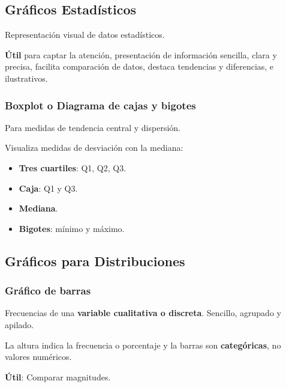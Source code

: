 \hypertarget{gruxe1ficos-estaduxedsticos}{%
\subsection{Gráficos Estadísticos}\label{gruxe1ficos-estaduxedsticos}}

Representación visual de datos estadísticos.

\textbf{Útil} para captar la atención, presentación de información
sencilla, clara y precisa, facilita comparación de datos, destaca
tendencias y diferencias, e ilustrativos.

\hypertarget{boxplot-o-diagrama-de-cajas-y-bigotes}{%
\subsubsection{Boxplot o Diagrama de cajas y
bigotes}\label{boxplot-o-diagrama-de-cajas-y-bigotes}}

Para medidas de tendencia central y dispersión.

Visualiza medidas de desviación con la mediana:

\begin{itemize}
\tightlist
\item
  \textbf{Tres cuartiles}: Q1, Q2, Q3.
\item
  \textbf{Caja}: Q1 y Q3.
\item
  \textbf{Mediana}.
\item
  \textbf{Bigotes}: mínimo y máximo.
\end{itemize}

\hypertarget{gruxe1ficos-para-distribuciones}{%
\subsection{Gráficos para
Distribuciones}\label{gruxe1ficos-para-distribuciones}}

\hypertarget{gruxe1fico-de-barras}{%
\subsubsection{Gráfico de barras}\label{gruxe1fico-de-barras}}

Frecuencias de una \textbf{variable cualitativa o discreta}. Sencillo,
agrupado y apilado.

La altura indica la frecuencia o porcentaje y la barras son
\textbf{categóricas}, no valores numéricos.

\textbf{Útil}: Comparar magnitudes.

